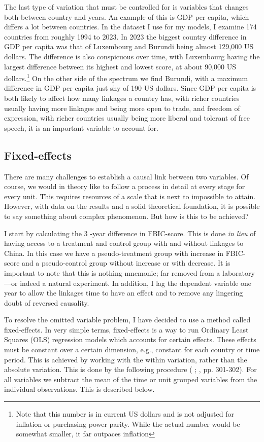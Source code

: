 The last type of variation that must be controlled for is variables that changes both between country and years. An example of this is GDP per capita, which differs a lot between countries. In the dataset I use for my models, I examine 174 countries from roughly 1994 to 2023. In 2023 the biggest country difference in GDP per capita was that of Luxembourg and Burundi being almost 129,000 US dollars. The difference is also conspicuous over time, with Luxembourg having the largest difference between its highest and lowest score, at about 90,000 US dollars.\footnote{Note that this number is in current US dollars and is not adjusted for inflation or purchasing power parity. While the actual number would be somewhat smaller, it far outpaces inflation} On the other side of the spectrum we find Burundi, with a maximum difference in GDP per capita just shy of 190 US dollars. Since GDP per capita is both likely to affect how many linkages a country has, with richer countries usually having more linkages and being more open to trade, and freedom of expression, with richer countries usually being more liberal and tolerant of free speech, it is an important variable to account for.

\subsection{Fixed-effects}
There are many challenges to establish a causal link between two variables. Of course, we would in theory like to follow a process in detail at every stage for every unit. This requires resources of a scale that is next to impossible to attain. However, with data on the results and a solid theoretical foundation, it is possible to say something about complex phenomenon. But how is this to be achieved?

I start by calculating the 3 -year difference in FBIC-score. This is done \textit{in lieu} of having access to a treatment and control group with and without linkages to China. In this case we have a pseudo-treatment group with increase in FBIC-score and a pseudo-control group without increase or with decrease. It is important to note that this is nothing  mnemonic; far removed from a laboratory---or indeed a natural experiment. In addition, I lag the dependent variable one year to allow the linkages time to have an effect and to remove any lingering doubt of reversed causality.

To resolve the omitted variable problem, I have decided to use a method called fixed-effects. In very simple terms, fixed-effects is a way to run Ordinary Least Squares (OLS) regression models which accounts for certain effects. These effects must be constant over a certain dimension, e.g., constant for each country or time period. This is achieved by working with the within variation, rather than the absolute variation. This is done by the following procedure (\citeauthor{huntington-klein_effect_2022} \citeyear{huntington-klein_effect_2022}; \citeauthor{wooldridge_econometric_2010} \citeyear{wooldridge_econometric_2010}, pp. 301-302). For all variables we subtract the mean of the time or unit grouped variables from the individual observations. This is described below.

